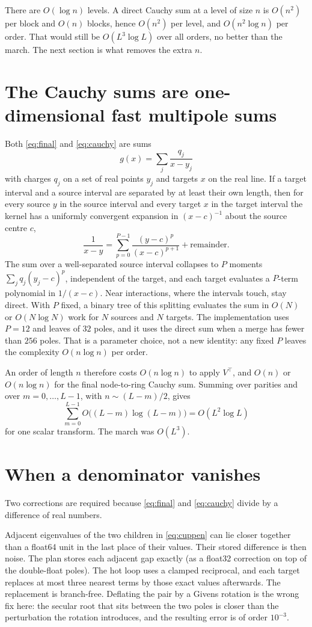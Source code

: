 \documentclass[11pt,a4paper]{article}
\numberwithin{equation}{section}
\begin{document}
There are $O(\log n)$ levels. A direct Cauchy sum at a level of size $n$ is $O(n^2)$ per
block and $O(n)$ blocks, hence $O(n^2)$ per level, and $O(n^2\log n)$ per order. That
would still be $O(L^3\log L)$ over all orders, no better than the march. The next section
is what removes the extra $n$.

\section{The Cauchy sums are one-dimensional fast multipole sums}
\label{sec:fmm}

Both \eqref{eq:final} and \eqref{eq:cauchy} are sums
\[
  g(x) = \sum_j \frac{q_j}{x-y_j}
\]
with charges $q_j$ on a set of real points $y_j$ and targets $x$ on the real line.
If a target interval and a source interval are separated by at least their own length,
then for every source $y$ in the source interval and every target $x$ in the target interval
the kernel has a uniformly convergent expansion in $(x-c)^{-1}$ about the source centre $c$,
\[
  \frac{1}{x-y}
  = \sum_{p=0}^{P-1} \frac{(y-c)^p}{(x-c)^{p+1}} + \text{remainder}.
\]
The sum over a well-separated source interval collapses to $P$ moments
$\sum_j q_j (y_j-c)^p$, independent of the target, and each target evaluates a $P$-term
polynomial in $1/(x-c)$. Near interactions, where the intervals touch, stay direct.
With $P$ fixed, a binary tree of this splitting evaluates the sum in $O(N)$ or
$O(N\log N)$ work for $N$ sources and $N$ targets. The implementation uses $P=12$ and
leaves of $32$ poles, and it uses the direct sum when a merge has fewer than $256$ poles.
That is a parameter choice, not a new identity: any fixed $P$ leaves the complexity
$O(n\log n)$ per order.

An order of length $n$ therefore costs $O(n\log n)$ to apply $V^\top$, and $O(n)$ or
$O(n\log n)$ for the final node-to-ring Cauchy sum. Summing over parities and over
$m=0,\dots,L-1$, with $n\sim (L-m)/2$, gives
\[
  \sum_{m=0}^{L-1} O\bigl((L-m)\log(L-m)\bigr) = O(L^2\log L)
\]
for one scalar transform. The march was $O(L^3)$.

\section{When a denominator vanishes}
\label{sec:coinc}

Two corrections are required because \eqref{eq:final} and \eqref{eq:cauchy} divide by a
difference of real numbers.

Adjacent eigenvalues of the two children in \eqref{eq:cuppen} can lie closer together than
a float64 unit in the last place of their values. Their stored difference is then noise.
The plan stores each adjacent gap exactly (as a float32 correction on top of the
double-float poles). The hot loop uses a clamped reciprocal, and each target replaces at
most three nearest terms by those exact values afterwards. The replacement is branch-free.
Deflating the pair by a Givens rotation is the wrong fix here: the secular root that sits
between the two poles is closer than the perturbation the rotation introduces, and the
resulting error is of order $10^{-3}$.
\end{document}
